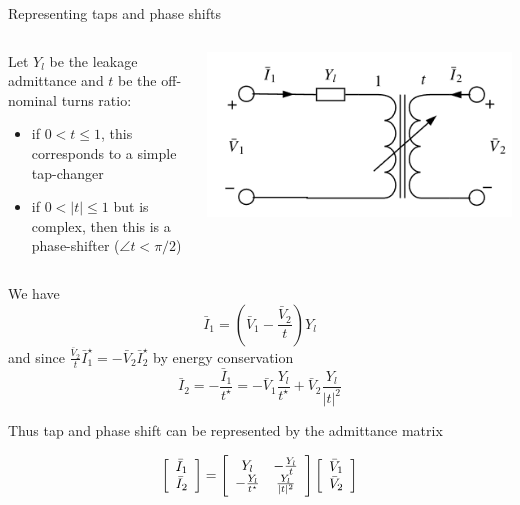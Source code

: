 \begin{frame}[allowframebreaks]{Representing taps and phase shifts}


\begin{columns}
    \begin{column}{0.5\textwidth}
    Let $Y_l$ be the leakage admittance and $t$ be the off-nominal turns ratio:
    \begin{itemize}
        \item if $ 0 < t \leq 1$, this corresponds to a simple tap-changer
        \item if $ 0 < |t| \leq 1$ but is complex, then this is a phase-shifter ($\angle{t} < \pi/2$)
    \end{itemize}
    \end{column}
    \begin{column}{0.45\textwidth}
        \includegraphics[width=\textwidth]{images/tap-shift-tfo.png}
    \end{column}
\end{columns}

We have 
$$\bar{I}_1 = \left(\bar{V}_1 - \frac{\bar{V}_2}{t}\right) Y_l$$
and since $\frac{\bar{V}_2}{t} \bar{I}_1^\star = -\bar{V}_2 \bar{I}_2^\star$ by energy conservation
$$\bar{I}_2 = - \frac{\bar{I}_1}{t^\star} = - \bar{V}_1 \frac{Y_l}{t^\star} + \bar{V}_2 \frac{Y_l}{|t|^2}$$

Thus tap and phase shift can be represented by the admittance matrix

$$\left[\begin{array}{c} \bar{I}_1 \\ \bar{I}_2\end{array}\right] 
 = \left[\begin{array}{c c} Y_l & -\frac{Y_l}{t} \\ -\frac{Y_l}{t^\star} & \frac{Y_l}{|t|^2} \end{array}\right]
 \left[\begin{array}{c} \bar{V}_1 \\ \bar{V}_2\end{array}\right]$$


\end{frame}
